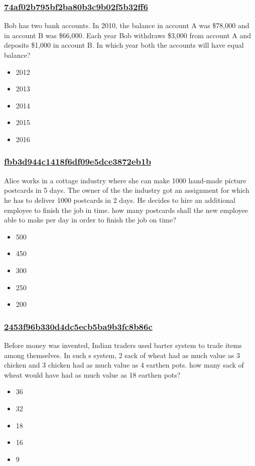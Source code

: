 \documentclass[]{beamer}
\begin{document}
\begin{frame}
    \frametitle{\underline{74af02b795bf2ba80b3c9b02f5b32ff6}}
    Bob has two bank accounts. In 2010, the balance in account A was \$78,000 and in account B was \$66,000. Each year Bob  withdraws \$3,000 from account A and deposits \$1,000 in account B. In which year both the accounts will have equal balance?
    \begin{itemize}
        \item
            2012
        \item
            2013
        \item
            2014
        \item
            2015
        \item
            2016
    \end{itemize}
\end{frame}
\begin{frame}
    \frametitle{\underline{fbb3d944c1418f6df09e5dce3872eb1b}}
    Alice works in a cottage industry where she can make 1000 hand-made picture postcards in 5 days. The owner of the the industry got an assignment for which he has to deliver 1000 postcards in 2 days. He decides to hire an additional employee to finish the job in time. how many postcards shall the new employee able to make per day in order to finish the job on time?
    \begin{itemize}
        \item
            500
        \item
            450
        \item
            300
        \item
            250
        \item
            200
    \end{itemize}
\end{frame}
\begin{frame}
    \frametitle{\underline{2453f96b330d4dc5ecb5ba9b3fc8b86c}}
    Before money was invented, Indian traders used barter system to trade items among themselves. In such s system, 2 sack of wheat had as much value as 3 chicken and 3 chicken had as much value as 4 earthen pots. how many sack of wheat would have had as much value as 18 earthen pots?

    \begin{itemize}
        \item
            36
        \item
            32
        \item
            18
        \item
            16
        \item
            9
    \end{itemize}
\end{frame}
\end{document}

